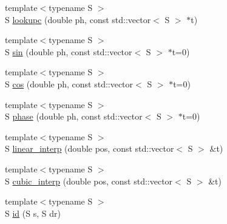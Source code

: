 \begin{DoxyCompactItemize}
\item 
{\footnotesize template$<$typename S $>$ }\\S \hyperlink{namespace_aurora_afab81d7b8873e7850073124fcf37eeea}{lookupc} (double ph, const std\+::vector$<$ S $>$ $\ast$t)
\item 
{\footnotesize template$<$typename S $>$ }\\S \hyperlink{namespace_aurora_a76909b8c5d5801213d35fffa69499885}{sin} (double ph, const std\+::vector$<$ S $>$ $\ast$t=0)
\item 
{\footnotesize template$<$typename S $>$ }\\S \hyperlink{namespace_aurora_a0269c3758ab62d6a910cd8f7ace7fba2}{cos} (double ph, const std\+::vector$<$ S $>$ $\ast$t=0)
\item 
{\footnotesize template$<$typename S $>$ }\\S \hyperlink{namespace_aurora_a6a6af5d9695d0ec8fcb343c456c1faab}{phase} (double ph, const std\+::vector$<$ S $>$ $\ast$t=0)
\item 
{\footnotesize template$<$typename S $>$ }\\S \hyperlink{namespace_aurora_acdc5f35b9cbf54f7fc84a423d76bd488}{linear\+\_\+interp} (double pos, const std\+::vector$<$ S $>$ \&t)
\item 
{\footnotesize template$<$typename S $>$ }\\S \hyperlink{namespace_aurora_a35b9cf383290bddedd82b7c3d0f05e81}{cubic\+\_\+interp} (double pos, const std\+::vector$<$ S $>$ \&t)
\item 
{\footnotesize template$<$typename S $>$ }\\S \hyperlink{namespace_aurora_aca47d4c2fcfc307c85418fe7a0b1e98e}{id} (S s, S dr)
\end{DoxyCompactItemize}
